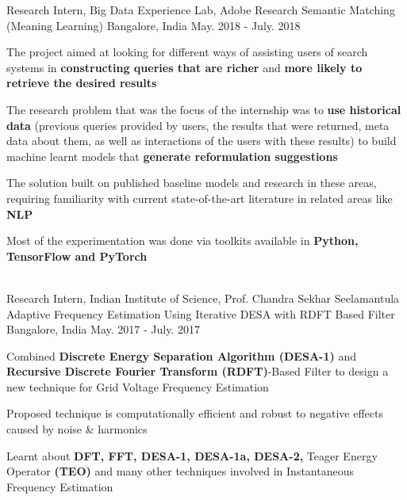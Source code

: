 \vspace{-0.1cm}
\begin{cventries}
    \cventry
    {Research Intern, Big Data Experience Lab, Adobe Research}
    {Semantic Matching (Meaning Learning)}
    {Bangalore, India}
    {May. 2018 - July. 2018}
    {
      \begin{cvitems}
        \item {The project aimed at looking for different ways of assisting users of search systems in \textbf{constructing queries that are richer} and \textbf{more likely to retrieve the desired results}}
\item{The research problem that was the focus of the internship was to \textbf{use historical data} (previous queries provided by users, the results that were returned, meta data about them, as well as interactions of the users with these results) to build machine learnt models that \textbf{generate reformulation suggestions}}
\item{The solution built on published baseline models and research in these areas, requiring familiarity with current state-of-the-art literature in related areas like \textbf{NLP}}
\item{Most of the experimentation was done via toolkits available in \textbf{Python, TensorFlow and PyTorch}}
      \end{cvitems}
    }\\
    \vspace{2mm}
    \cventry
    {Research Intern, Indian Institute of Science, Prof. Chandra Sekhar Seelamantula}
    {Adaptive Frequency
Estimation Using Iterative
DESA with RDFT Based
Filter}
    {Bangalore, India}
    {May. 2017 - July. 2017}
    {
      \begin{cvitems}
        \item {Combined \textbf{Discrete Energy Separation Algorithm (DESA-1)} and \textbf{Recursive Discrete Fourier Transform (RDFT)}-Based Filter to design a new technique for Grid Voltage Frequency Estimation}
        \item {Proposed technique is computationally efficient and robust to negative effects caused by noise \& harmonics}
        \item {Learnt about \textbf{DFT, FFT, DESA-1, DESA-1a, DESA-2,} Teager Energy Operator \textbf{(TEO)} and many other techniques involved in Instantaneous Frequency Estimation}
      \end{cvitems}
    }
\end{cventries}
